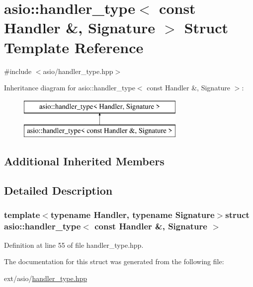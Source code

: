 \hypertarget{structasio_1_1handler__type_3_01const_01_handler_01_6_00_01_signature_01_4}{}\section{asio\+:\+:handler\+\_\+type$<$ const Handler \&, Signature $>$ Struct Template Reference}
\label{structasio_1_1handler__type_3_01const_01_handler_01_6_00_01_signature_01_4}


{\ttfamily \#include $<$asio/handler\+\_\+type.\+hpp$>$}

Inheritance diagram for asio\+:\+:handler\+\_\+type$<$ const Handler \&, Signature $>$\+:\begin{figure}[H]
\begin{center}
\leavevmode
\includegraphics[height=2.000000cm]{structasio_1_1handler__type_3_01const_01_handler_01_6_00_01_signature_01_4}
\end{center}
\end{figure}
\subsection*{Additional Inherited Members}


\subsection{Detailed Description}
\subsubsection*{template$<$typename Handler, typename Signature$>$struct asio\+::handler\+\_\+type$<$ const Handler \&, Signature $>$}



Definition at line 55 of file handler\+\_\+type.\+hpp.



The documentation for this struct was generated from the following file\+:\begin{DoxyCompactItemize}
\item 
ext/asio/\hyperlink{handler__type_8hpp}{handler\+\_\+type.\+hpp}\end{DoxyCompactItemize}
